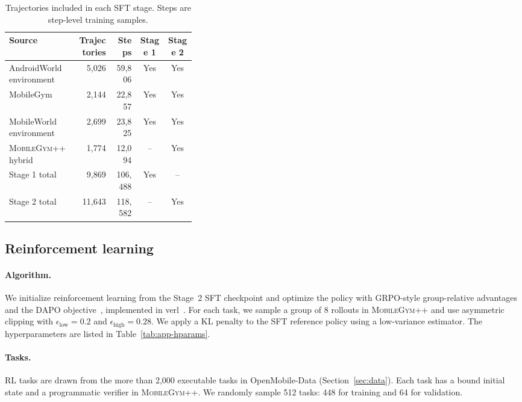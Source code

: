 \begin{table}[t]
\centering
\small
\caption{Trajectories included in each SFT stage. Steps are step-level training samples.}
\label{tab:app-sft-data}
\setlength{\tabcolsep}{4pt}
\begin{tabular}{p{0.36\linewidth}rrcc}
\toprule
Source & Trajectories & Steps & Stage 1 & Stage 2 \\
\midrule
AndroidWorld environment & 5,026 & 59,806 & Yes & Yes \\
MobileGym & 2,144 & 22,857 & Yes & Yes \\
MobileWorld environment & 2,699 & 23,825 & Yes & Yes \\
\textsc{MobileGym++} hybrid & 1,774 & 12,094 & -- & Yes \\
\midrule
Stage 1 total & 9,869 & 106,488 & Yes & -- \\
Stage 2 total & 11,643 & 118,582 & -- & Yes \\
\bottomrule
\end{tabular}
\end{table}

\subsection{Reinforcement learning}
\label{app:rl}

\paragraph{Algorithm.}
We initialize reinforcement learning from the Stage~2 SFT checkpoint and optimize the policy with GRPO-style group-relative advantages~\citep{shao2024deepseekmath} and the DAPO objective~\citep{yu2026dapo}, implemented in verl~\citep{sheng2025hybridflow}. For each task, we sample a group of 8 rollouts in \textsc{MobileGym++} and use asymmetric clipping with $\epsilon_{\text{low}}{=}0.2$ and $\epsilon_{\text{high}}{=}0.28$. We apply a KL penalty to the SFT reference policy using a low-variance estimator. The hyperparameters are listed in Table~\ref{tab:app-hparams}.

\paragraph{Tasks.}
RL tasks are drawn from the more than 2,000 executable tasks in OpenMobile-Data (Section~\ref{sec:data}). Each task has a bound initial state and a programmatic verifier in \textsc{MobileGym++}. We randomly sample 512 tasks: 448 for training and 64 for validation.

